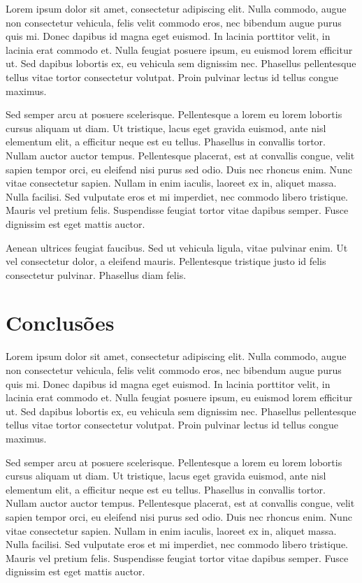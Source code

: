 \documentclass[brazil,hardcopy,openany,a5paper]{ufscthesis}
\begin{document}
Lorem ipsum dolor sit amet, consectetur adipiscing elit. Nulla commodo, augue non consectetur vehicula, felis velit commodo eros, nec bibendum augue purus quis mi. Donec dapibus id magna eget euismod. In lacinia porttitor velit, in lacinia erat commodo et. Nulla feugiat posuere ipsum, eu euismod lorem efficitur ut. Sed dapibus lobortis ex, eu vehicula sem dignissim nec. Phasellus pellentesque tellus vitae tortor consectetur volutpat. Proin pulvinar lectus id tellus congue maximus.

Sed semper arcu at posuere scelerisque. Pellentesque a lorem eu lorem lobortis cursus aliquam ut diam. Ut tristique, lacus eget gravida euismod, ante nisl elementum elit, a efficitur neque est eu tellus. Phasellus in convallis tortor. Nullam auctor auctor tempus. Pellentesque placerat, est at convallis congue, velit sapien tempor orci, eu eleifend nisi purus sed odio. Duis nec rhoncus enim. Nunc vitae consectetur sapien. Nullam in enim iaculis, laoreet ex in, aliquet massa. Nulla facilisi. Sed vulputate eros et mi imperdiet, nec commodo libero tristique. Mauris vel pretium felis. Suspendisse feugiat tortor vitae dapibus semper. Fusce dignissim est eget mattis auctor.

Aenean ultrices feugiat faucibus. Sed ut vehicula ligula, vitae pulvinar enim. Ut vel consectetur dolor, a eleifend mauris. Pellentesque tristique justo id felis consectetur pulvinar. Phasellus diam felis.

\chapter{Conclusões}
\label{chapter:conclusoes}
	
Lorem ipsum dolor sit amet, consectetur adipiscing elit. Nulla commodo, augue non consectetur vehicula, felis velit commodo eros, nec bibendum augue purus quis mi. Donec dapibus id magna eget euismod. In lacinia porttitor velit, in lacinia erat commodo et. Nulla feugiat posuere ipsum, eu euismod lorem efficitur ut. Sed dapibus lobortis ex, eu vehicula sem dignissim nec. Phasellus pellentesque tellus vitae tortor consectetur volutpat. Proin pulvinar lectus id tellus congue maximus.

Sed semper arcu at posuere scelerisque. Pellentesque a lorem eu lorem lobortis cursus aliquam ut diam. Ut tristique, lacus eget gravida euismod, ante nisl elementum elit, a efficitur neque est eu tellus. Phasellus in convallis tortor. Nullam auctor auctor tempus. Pellentesque placerat, est at convallis congue, velit sapien tempor orci, eu eleifend nisi purus sed odio. Duis nec rhoncus enim. Nunc vitae consectetur sapien. Nullam in enim iaculis, laoreet ex in, aliquet massa. Nulla facilisi. Sed vulputate eros et mi imperdiet, nec commodo libero tristique. Mauris vel pretium felis. Suspendisse feugiat tortor vitae dapibus semper. Fusce dignissim est eget mattis auctor.
\end{document}
